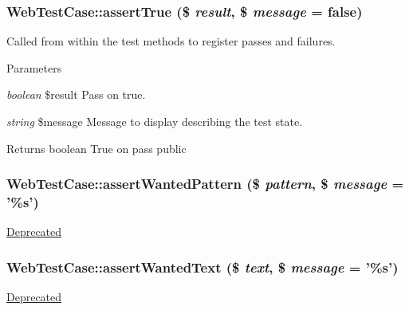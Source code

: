 \hypertarget{class_web_test_case_a13f27b3d3f2db36087e3a5e40299ada0}{
\subsubsection[{assertTrue}]{\setlength{\rightskip}{0pt plus 5cm}WebTestCase::assertTrue (\$ {\em result}, \/  \$ {\em message} = {\ttfamily false})}}
\label{class_web_test_case_a13f27b3d3f2db36087e3a5e40299ada0}
Called from within the test methods to register passes and failures. 
\begin{DoxyParams}{Parameters}
\item[{\em boolean}]\$result Pass on true. \item[{\em string}]\$message Message to display describing the test state. \end{DoxyParams}
\begin{DoxyReturn}{Returns}
boolean True on pass  public 
\end{DoxyReturn}
\hypertarget{class_web_test_case_adfb5d7b168c179976f9aee9447e914e9}{
\subsubsection[{assertWantedPattern}]{\setlength{\rightskip}{0pt plus 5cm}WebTestCase::assertWantedPattern (\$ {\em pattern}, \/  \$ {\em message} = {\ttfamily '\%s'})}}
\label{class_web_test_case_adfb5d7b168c179976f9aee9447e914e9}
\begin{Desc}
\item[\hyperlink{deprecated__deprecated000028}{Deprecated}]\end{Desc}
\hypertarget{class_web_test_case_aba9b544e11cbfdd2e34ec34fefed908a}{
\subsubsection[{assertWantedText}]{\setlength{\rightskip}{0pt plus 5cm}WebTestCase::assertWantedText (\$ {\em text}, \/  \$ {\em message} = {\ttfamily '\%s'})}}
\label{class_web_test_case_aba9b544e11cbfdd2e34ec34fefed908a}
\begin{Desc}
\item[\hyperlink{deprecated__deprecated000026}{Deprecated}]\end{Desc}
